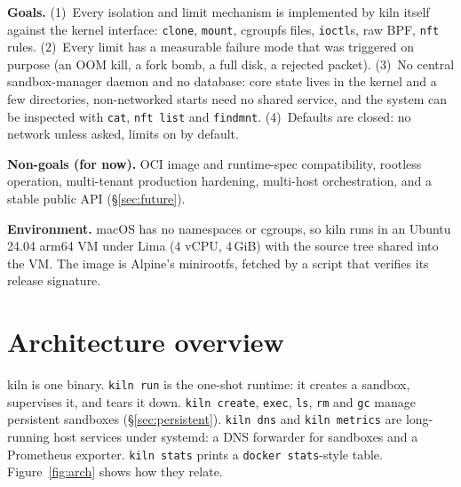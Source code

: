 \documentclass[10pt,letterpaper]{article}
\newcommand{\code}[1]{\texttt{#1}}
\begin{document}
\textbf{Goals.} (1)~Every isolation and limit mechanism is implemented by kiln
itself against the kernel interface: \code{clone}, \code{mount}, cgroupfs
files, \code{ioctl}s, raw BPF, \code{nft} rules. (2)~Every limit has a
measurable failure mode that was triggered on purpose (an OOM kill, a fork bomb,
a full disk, a rejected packet). (3)~No central sandbox-manager daemon and no
database: core state lives in the kernel and a few directories, non-networked
starts need no shared service, and the system can be inspected with
\code{cat}, \code{nft list} and \code{findmnt}. (4)~Defaults are closed: no
network unless asked, limits on by default.

\textbf{Non-goals (for now).} OCI image and runtime-spec compatibility, rootless
operation, multi-tenant production hardening, multi-host orchestration, and a
stable public API (\S\ref{sec:future}).

\textbf{Environment.} macOS has no namespaces or cgroups, so kiln runs in an
Ubuntu 24.04 arm64 VM under Lima (4 vCPU, 4\,GiB) with the source tree shared into
the VM. The image is Alpine's minirootfs, fetched by a script that verifies its release signature.

\section{Architecture overview}

kiln is one binary. \code{kiln run} is the one-shot runtime: it creates a
sandbox, supervises it, and tears it down. \code{kiln create}, \code{exec},
\code{ls}, \code{rm} and \code{gc} manage persistent sandboxes
(\S\ref{sec:persistent}). \code{kiln dns} and
\code{kiln metrics} are long-running host services under systemd: a DNS
forwarder for sandboxes and a Prometheus exporter. \code{kiln stats} prints a
\code{docker stats}-style table. Figure~\ref{fig:arch} shows how they relate.
\end{document}
